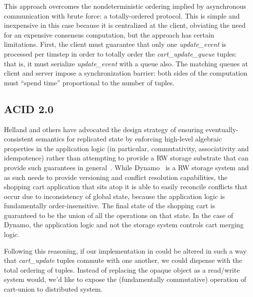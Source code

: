 This approach overcomes the nondeterministic ordering implied by asynchronous 
communication with brute force: a totally-ordered protocol.  This is simple and inexpensive 
in this case because it is centralized at the client, obviating the need for an expensive consensus computation, but the approach has certain limitations.  First, the client
must guarantee that only one {\em update\_event} is processed per timstep in order to totally
order the {\em cart\_update\_queue} tuples: that is, it must serialize {\em update\_event} with
a queue also.  The matching queues at client and server impose a synchronization barrier: both sides of the computation must ``spend time'' proportional to the number of tuples.

\subsection{ACID 2.0}

Helland and others have advocated the design strategy of ensuring eventually-consistent 
semantics for replicated state by enforcing high-level algebraic 
properties in the application logic (in particular, commutativity, associativity and 
idempotence) rather than attempting to provide a RW storage substrate that can provide
such guarantees in general~\cite{quicksand, beyond}.  While Dynamo~\cite{dynamo} 
is a RW storage system
and as such needs to provide versioning and conflict resolution capabilities, the shopping
cart application that sits atop it is able to easily reconcile conflicts that occur due to inconsistency of global state, because the application logic is fundamentally order-insensitive.
The final state of the shopping cart is guaranteed to be the union of all the operations on
that state.  In the case of Dynamo, the application logic and not the storage system controls
cart merging logic.

Following this reasoning, if our implementation in \lang could be altered in such a way that
{\em cart\_update} tuples commute with one another,  we could dispense with the total
ordering of tuples.  Instead of replacing the opaque object as a read/write system would,
we'd like to expose the (fundamentally commutative) operation of cart-union to distributed
system.

